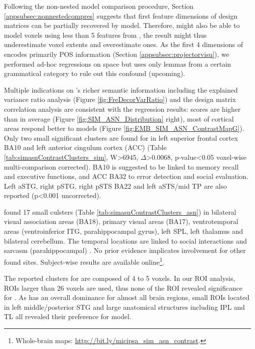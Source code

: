 Following the non-nested model comparison procedure, Section \ref{appsubsec:nonnestedcompres} suggests that first feature dimensions of  design matrices can be partially recovered by  model. Therefore,  might also be able to model voxels using less than 5 features from , the result might thus underestimate  voxel extents and overestimate  ones. As the first 4 dimensions of  encodes primarily POS information (Section \ref{appsubsec:projectorvisu}), we performed ad-hoc regressions on  space but uses only lemmas from a certain grammatical category to rule out this confound (upcoming). 

Multiple indications on 's richer semantic information including the explained variance ratio analysis (Figure \ref{fig:FreDecorVarRatio}) and the design matrix correlation analysis are consistent with the regression results:  scores are higher than  in average (Figure \ref{fig:SIM_ASN_Distribution} right), most of cortical areas respond better to  models (Figure \ref{fig:EMB_SIM_ASN_ContrastMapG}). Only two small significant clusters are found for  in left superior frontal cortex BA10 and left anterior cingulum cortex (ACC) (Table \ref{tab:simasnContrastClusters_sim}, W>6945, \(\Delta\)>0.0068, p-value<0.05 voxel-wise multi-comparison corrected). BA10 is suggested to be linked to memory recall and executive functions, and ACC BA32 to error detection and social evaluation. Left aSTG, right pSTG, right pSTS BA22 and left aSTS/mid TP are also reported (p<0.001 uncorrected). 

 found 17 small culsters  (Table \ref{tab:simasnContrastClusters_asn}) in bilateral visual association areas (BA18), primary visual areas (BA17), ventrotemporal areas (ventroinferior ITG, parahippocampal gyrus), left SPL, left thalamus and bilateral cerebellum. The temporal locations are linked to social interactions and sarcasm (parahippocampal) \parencite{rankinDetectingSarcasmParalinguistic2009}. No prior evidence implicates \similarity involvement for other found sites. Subject-wise results are available online\footnote{Whole-brain maps: \url{http://bit.ly/micipsa_sim_asn_contrast}.}.

The reported clusters for  are composed of 4 to 5 voxels. In our ROI analysis, ROIs larger than 26 voxels are used, thus none of the ROI revealed significance for . As  has an overall dominance for almost all brain regions, small ROIs located in left middle/posterior STG and large anatomical structures including IPL and TL all revealed their preference for  model. 

